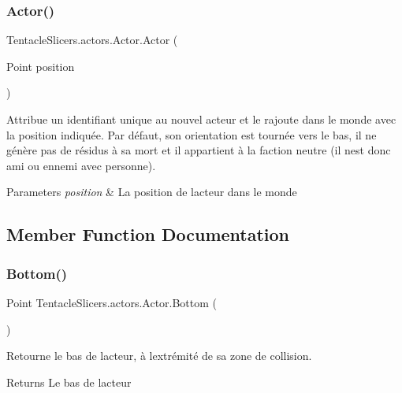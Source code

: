 \subsubsection{\texorpdfstring{Actor()}{Actor()}}
{\footnotesize\ttfamily Tentacle\+Slicers.\+actors.\+Actor.\+Actor (\begin{DoxyParamCaption}\item[{Point}]{position }\end{DoxyParamCaption})}



Attribue un identifiant unique au nouvel acteur et le rajoute dans le monde avec la position indiquée. Par défaut, son orientation est tournée vers le bas, il ne génère pas de résidus à sa mort et il appartient à la faction neutre (il n\textquotesingle{}est donc ami ou ennemi avec personne). 


\begin{DoxyParams}{Parameters}
{\em position} & La position de l\textquotesingle{}acteur dans le monde \\
\hline
\end{DoxyParams}


\subsection{Member Function Documentation}
\mbox{\label{class_tentacle_slicers_1_1actors_1_1_actor_aaf93f9e36eee2f41a47cf5c0b954b535}} 
\subsubsection{\texorpdfstring{Bottom()}{Bottom()}}
{\footnotesize\ttfamily Point Tentacle\+Slicers.\+actors.\+Actor.\+Bottom (\begin{DoxyParamCaption}{ }\end{DoxyParamCaption})}



Retourne le bas de l\textquotesingle{}acteur, à l\textquotesingle{}extrémité de sa zone de collision. 

\begin{DoxyReturn}{Returns}
Le bas de l\textquotesingle{}acteur 
\end{DoxyReturn}
\mbox{\label{class_tentacle_slicers_1_1actors_1_1_actor_a55440b152571f25e7907a1c59b070aac}} 
